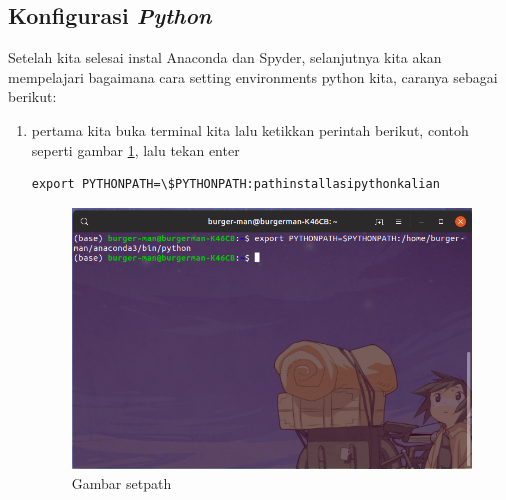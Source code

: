 \subsection{Konfigurasi \textbf{\textit{Python}}}
Setelah kita selesai instal Anaconda dan Spyder, selanjutnya kita akan mempelajari bagaimana cara setting environments python kita, caranya sebagai berikut:

\begin{enumerate}

\item pertama kita buka terminal kita lalu ketikkan perintah berikut, contoh seperti gambar \ref{setpath}, lalu tekan enter
\begin{lstlisting}
export PYTHONPATH=\$PYTHONPATH:pathinstallasipythonkalian
\end{lstlisting}
\begin{figure}[H]
\centering
\includegraphics[width=1\textwidth]{figures/ubuntu/setpath.png}
\caption{Gambar setpath}
\label{setpath}
\end{figure}

\end{enumerate}


